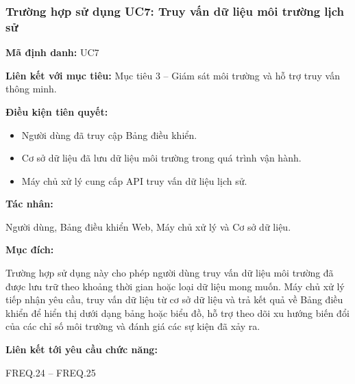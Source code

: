 \documentclass[a4paper,12pt]{article}
\begin{document}
\subsubsection{Trường hợp sử dụng UC7: Truy vấn dữ liệu môi trường lịch sử}

\textbf{Mã định danh:} UC7

\textbf{Liên kết với mục tiêu:} Mục tiêu 3 -- Giám sát môi trường và hỗ trợ truy vấn thông minh.

\textbf{Điều kiện tiên quyết:}
\begin{itemize}
    \item Người dùng đã truy cập Bảng điều khiển.
    \item Cơ sở dữ liệu đã lưu dữ liệu môi trường trong quá trình vận hành.
    \item Máy chủ xử lý cung cấp API truy vấn dữ liệu lịch sử.
\end{itemize}

\textbf{Tác nhân:}

Người dùng, Bảng điều khiển Web, Máy chủ xử lý và Cơ sở dữ liệu.

\textbf{Mục đích:}

Trường hợp sử dụng này cho phép người dùng truy vấn dữ liệu môi trường đã được lưu trữ theo khoảng thời gian hoặc loại dữ liệu mong muốn. Máy chủ xử lý tiếp nhận yêu cầu, truy vấn dữ liệu từ cơ sở dữ liệu và trả kết quả về Bảng điều khiển để hiển thị dưới dạng bảng hoặc biểu đồ, hỗ trợ theo dõi xu hướng biến đổi của các chỉ số môi trường và đánh giá các sự kiện đã xảy ra.

\textbf{Liên kết tới yêu cầu chức năng:}

FREQ.24 -- FREQ.25
\end{document}
